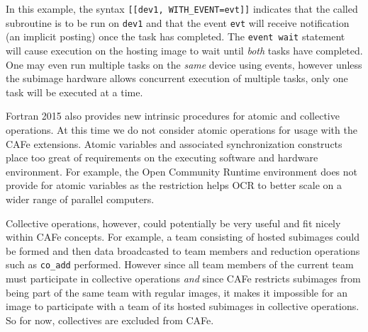 In this example, the syntax \texttt{[[dev1, WITH\_EVENT=evt]]} indicates that the called
subroutine is to be run on \texttt{dev1} and that the event \texttt{evt} will receive
notification (an implicit posting) once the task has completed.  The \texttt{event wait}
statement will cause execution on the hosting image to wait until \emph{both} tasks have
completed.  One may even run multiple tasks on the \emph{same} device using events,
however unless the subimage hardware allows concurrent execution of multiple tasks, only
one task will be executed at a time.

Fortran 2015 also provides new intrinsic procedures for atomic and collective operations.
At this time we do not consider atomic operations for usage with the CAFe extensions.
Atomic variables and associated synchronization constructs place too great of requirements
on the executing software and hardware environment.  For example, the Open Community
Runtime environment does not provide for atomic variables as the restriction
helps OCR to better scale on a wider range of parallel computers.

Collective operations, however, could potentially be very useful and fit nicely within
CAFe concepts.  For example, a team consisting of hosted subimages could be formed and
then data broadcasted to team members and reduction operations such as \texttt{co\_add}
performed.  However since all team members of the current team must participate in
collective operations \emph{and} since CAFe restricts subimages from being part of the
same team with regular images, it makes it impossible for an image to participate with a
team of its hosted subimages in collective operations.  So for now, collectives are
excluded from CAFe.
